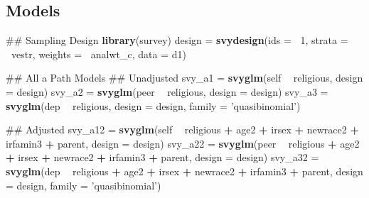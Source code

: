 \documentclass[]{DissertateUSU}
\newenvironment{Shaded}{\begin{snugshade}}{\end{snugshade}}
\newcommand{\KeywordTok}[1]{\textcolor[rgb]{0.13,0.29,0.53}{\textbf{#1}}}
\newcommand{\DataTypeTok}[1]{\textcolor[rgb]{0.13,0.29,0.53}{#1}}
\newcommand{\DecValTok}[1]{\textcolor[rgb]{0.00,0.00,0.81}{#1}}
\newcommand{\StringTok}[1]{\textcolor[rgb]{0.31,0.60,0.02}{#1}}
\newcommand{\OperatorTok}[1]{\textcolor[rgb]{0.81,0.36,0.00}{\textbf{#1}}}
\newcommand{\NormalTok}[1]{#1}
\begin{document}
\normalsize

\clearpage

\subsection*{Models}\label{models}

\small

\begin{Shaded}
\begin{Highlighting}[]
\NormalTok{## Sampling Design}
\KeywordTok{library}\NormalTok{(survey)}
\NormalTok{design =}\StringTok{ }\KeywordTok{svydesign}\NormalTok{(}\DataTypeTok{ids =} \OperatorTok{~}\DecValTok{1}\NormalTok{, }
                   \DataTypeTok{strata =} \OperatorTok{~}\NormalTok{vestr, }
                   \DataTypeTok{weights =} \OperatorTok{~}\NormalTok{analwt_c,}
                   \DataTypeTok{data =}\NormalTok{ d1)}

\NormalTok{## All a Path Models}
\NormalTok{## Unadjusted}
\NormalTok{svy_a1 =}\StringTok{ }\KeywordTok{svyglm}\NormalTok{(self }\OperatorTok{~}\StringTok{ }\NormalTok{religious, }\DataTypeTok{design =}\NormalTok{ design)}
\NormalTok{svy_a2 =}\StringTok{ }\KeywordTok{svyglm}\NormalTok{(peer }\OperatorTok{~}\StringTok{ }\NormalTok{religious, }\DataTypeTok{design =}\NormalTok{ design)}
\NormalTok{svy_a3 =}\StringTok{ }\KeywordTok{svyglm}\NormalTok{(dep }\OperatorTok{~}\StringTok{ }\NormalTok{religious, }\DataTypeTok{design =}\NormalTok{ design, }
                \DataTypeTok{family =} \StringTok{'quasibinomial'}\NormalTok{)}

\NormalTok{## Adjusted}
\NormalTok{svy_a12 =}\StringTok{ }\KeywordTok{svyglm}\NormalTok{(self }\OperatorTok{~}\StringTok{ }\NormalTok{religious }\OperatorTok{+}\StringTok{ }\NormalTok{age2 }\OperatorTok{+}\StringTok{ }
\StringTok{                   }\NormalTok{irsex }\OperatorTok{+}\StringTok{ }\NormalTok{newrace2 }\OperatorTok{+}\StringTok{ }\NormalTok{irfamin3 }\OperatorTok{+}\StringTok{ }\NormalTok{parent, }
                 \DataTypeTok{design =}\NormalTok{ design)}
\NormalTok{svy_a22 =}\StringTok{ }\KeywordTok{svyglm}\NormalTok{(peer }\OperatorTok{~}\StringTok{ }\NormalTok{religious }\OperatorTok{+}\StringTok{ }\NormalTok{age2 }\OperatorTok{+}\StringTok{ }
\StringTok{                   }\NormalTok{irsex }\OperatorTok{+}\StringTok{ }\NormalTok{newrace2 }\OperatorTok{+}\StringTok{ }\NormalTok{irfamin3 }\OperatorTok{+}\StringTok{ }\NormalTok{parent, }
                 \DataTypeTok{design =}\NormalTok{ design)}
\NormalTok{svy_a32 =}\StringTok{ }\KeywordTok{svyglm}\NormalTok{(dep }\OperatorTok{~}\StringTok{ }\NormalTok{religious }\OperatorTok{+}\StringTok{ }\NormalTok{age2 }\OperatorTok{+}\StringTok{ }
\StringTok{                   }\NormalTok{irsex }\OperatorTok{+}\StringTok{ }\NormalTok{newrace2 }\OperatorTok{+}\StringTok{ }\NormalTok{irfamin3 }\OperatorTok{+}\StringTok{ }\NormalTok{parent, }
                 \DataTypeTok{design =}\NormalTok{ design, }
                 \DataTypeTok{family =} \StringTok{'quasibinomial'}\NormalTok{)}


\end{Highlighting}
\end{Shaded}
\end{document}
